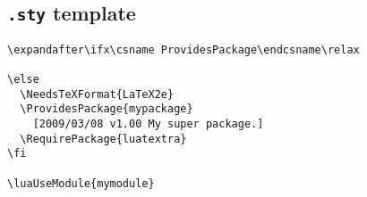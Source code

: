 \documentclass{article}
\begin{document}
\subsection{\texttt{.sty} template}

\begin{verbatim}
\expandafter\ifx\csname ProvidesPackage\endcsname\relax
  
\else
  \NeedsTeXFormat{LaTeX2e}
  \ProvidesPackage{mypackage}
    [2009/03/08 v1.00 My super package.]
  \RequirePackage{luatextra}
\fi

\luaUseModule{mymodule}
\end{verbatim}
\end{document}
